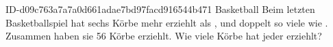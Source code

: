 \begin{exercise}
      {ID-d09c763a7a7a0d661adae7bd97facd916544b471}
      {Basketball}
  \ifproblem\problem
    Beim letzten Basketballspiel hat \xya{} sechs Körbe mehr erziehlt als \xyb,
    und \xyb{} doppelt so viele wie \xyc. Zusammen haben sie 56 Körbe erziehlt.
    Wie viele Körbe hat jeder erziehlt?
  \fi
\end{exercise}
